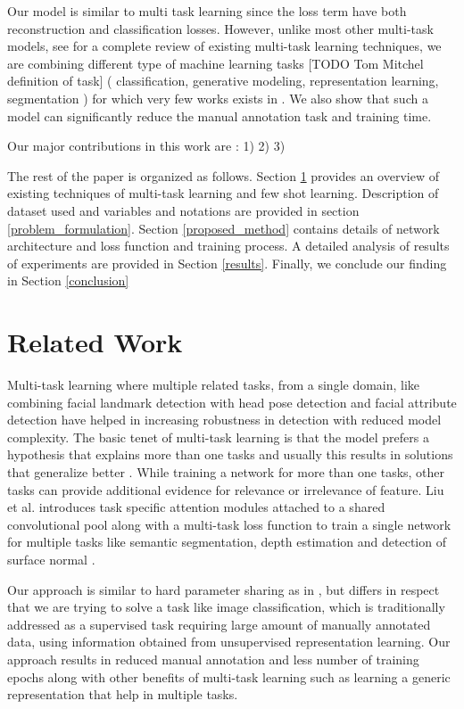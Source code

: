 \documentclass{uai2021} %
\begin{document}
Our model is similar to multi task learning since the loss term have both reconstruction and classification losses.
However, unlike most other multi-task models, see \cite{mtl_2017_ruder} \cite{mtl_2020_michael} for a complete review of existing multi-task learning techniques, we are combining  different type of machine learning tasks [TODO Tom Mitchel definition of task] ( classification, generative modeling, representation learning, segmentation )  for which very few works exists in \cite{laddernetwork}.
We also show that such a model can significantly reduce the manual annotation task and training time.

Our major contributions in this work are : 1) 2) 3)


The rest of the paper is organized as follows.
Section \ref{related_works} provides an overview of existing techniques of multi-task learning and few shot learning.
Description of dataset used and variables and notations are provided in section \ref{problem_formulation}.
Section \ref{proposed_method} contains details of network architecture and loss function and training process.
A detailed analysis of results of experiments are provided in Section \ref{results}.
Finally, we conclude our finding in Section \ref{conclusion}

\section{Related Work} \label{related_works}
Multi-task learning where multiple related tasks, from a single domain, like combining facial landmark detection with head pose detection and facial attribute detection \cite{mtl_zhang_2014} have helped in increasing robustness in detection with reduced model complexity.
The basic tenet of multi-task learning is that the model prefers a hypothesis that explains more than one tasks and usually this results in solutions that generalize better \cite{mtl_2017_ruder}.
While training a network for more than one tasks, other tasks can provide additional evidence for relevance or irrelevance of feature.
Liu et al. introduces task specific attention modules attached to a shared convolutional pool  along with a multi-task loss function to train a single network for multiple tasks like semantic segmentation, depth estimation and detection of surface normal \cite{mtl_liu_2019}.

Our approach is similar to hard parameter sharing as in \cite{mtl_zhang_2014} \cite{mtl_2016_dai}, but differs in respect that we are trying to solve a task like image classification, which is traditionally addressed as a supervised task requiring large amount of manually annotated data, using information obtained from  unsupervised representation learning.
Our approach results in reduced manual annotation and less number of training epochs along with other benefits of multi-task learning such as learning a generic representation that help in multiple tasks.
\end{document}
